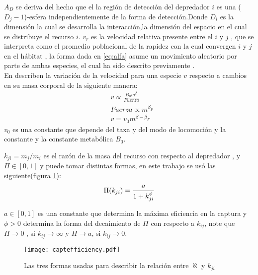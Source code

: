 $A_D$ se deriva del hecho que el la regi\'on de detecci\'on del depredador $i$ es una ($D_j-1$)-esfera independientemente de la forma de detecci\'on\citep{pawar2012dimensionality}.Donde $D_i$ es la dimensi\'on la cual se desarrolla la interacci\'on,la dimensi\'on del espacio en el cual se distribuye el recurso $i$.
$v_r$ es la velocidad relativa presente entre el $i$ y $j$ , que se interpreta como el promedio poblacional de la rapidez con la cual convergen $i$ y $j$ en el h\'abitat \citep[supinfo.]{pawar2012dimensionality} , la forma dada en \eqref{eq:alfa} asume un movimiento aleatorio por parte de ambas especies, el cual ha sido descrito previamente \citep{okubo2001diffusion}.\\
En \cite{pawar2012dimensionality} describen la variaci\'on de la velocidad para una especie $v$ respecto a cambios en su masa corporal de la siguiente manera:
\begin{equation}\label{eq:vel}
\begin{aligned}
&v \propto \frac{B_0 m^\beta}{Fuerza}\\
&Fuerza \propto m^{\beta_F} \\
&v = v_0m^{\beta - \beta_F}
\end{aligned}
\end{equation}
$v_0$ es una constante que depende del taxa y del modo de locomoci\'on y la constante y la constante metab\'olica $B_0$.\\ 

$k_{ji}= m_j/m_i$ es el raz\'on de la masa del recurso con respecto al depredador , y $\Pi \in [0,1]$ y  puede tomar distintas formas\citep{weitz2006size}, en este trabajo se us\'o las siguiente(figura \ref{fig:efficiency}): 
\begin{equation}\label{eq:sr}
\Pi(k_{ji}) =\frac{a}{1+k_{ji}^\phi} \\
\end{equation}

$a \in [0,1] $ es una constante que determina la m\'axima eficiencia en la captura y $\phi > 0 $ determina la forma del decaimiento de $\Pi$ con respecto a $k_{ij}$, note que $\Pi \to 0$ , si $k_{ij} \to \infty$ y $\Pi \to a $, si $k_{ij} \to 0$.

\begin{figure}
\begin{center}
 \texttt{[image: captefficiency.pdf]}
 \caption[formas para $\aleph$]{Las tres formas usadas para describir la relaci\'on entre $\aleph$ y $k_{ji}$}
 \label{fig:efficiency} 
\end{center}
\end{figure}

